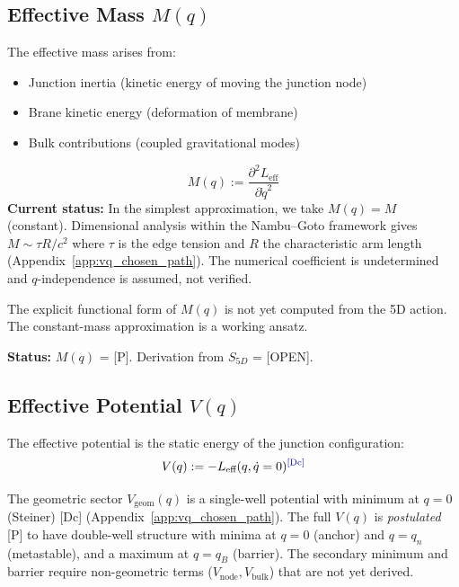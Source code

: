 \subsection{Effective Mass $M(q)$}

The effective mass arises from:
\begin{itemize}
    \item Junction inertia (kinetic energy of moving the junction node)
    \item Brane kinetic energy (deformation of membrane)
    \item Bulk contributions (coupled gravitational modes)
\end{itemize}

\begin{derivationbox}[title=Effective Mass]
    \begin{equation}
        M(q) := \frac{\partial^2 L_{\text{eff}}}{\partial \dot{q}^2}
    \end{equation}
    \textbf{Current status:} In the simplest approximation, we take $M(q) = M$
    (constant). Dimensional analysis within the Nambu--Goto framework gives
    $M \sim \tau R / c^2$ where $\tau$ is the edge tension and $R$ the
    characteristic arm length (Appendix~\ref{app:vq_chosen_path}). The
    numerical coefficient is undetermined and $q$-independence is assumed,
    not verified.
    \tagP
\end{derivationbox}

\begin{edcopenbox}[title=Open: Derive $M(q)$ from 5D]
    The explicit functional form of $M(q)$ is not yet computed from the 5D
    action. The constant-mass approximation is a working ansatz.

    \textbf{Status:} $M(q)$ = [P]. Derivation from $S_{5D}$ = [OPEN].
    \tagOpen
\end{edcopenbox}

\subsection{Effective Potential $V(q)$}

The effective potential is the static energy of the junction configuration:
\begin{equation}
    V(q) := -L_{\text{eff}}(q, \dot{q}=0)
    \tagDc
\end{equation}

The geometric sector $V_{\mathrm{geom}}(q)$ is a single-well potential with
minimum at $q = 0$ (Steiner) [Dc] (Appendix~\ref{app:vq_chosen_path}). The
full $V(q)$ is \emph{postulated} [P] to have double-well structure with minima
at $q = 0$ (anchor) and $q = q_n$ (metastable), and a maximum at $q = q_B$
(barrier). The secondary minimum and barrier require non-geometric terms
($V_{\mathrm{node}}, V_{\mathrm{bulk}}$) that are not yet derived.


